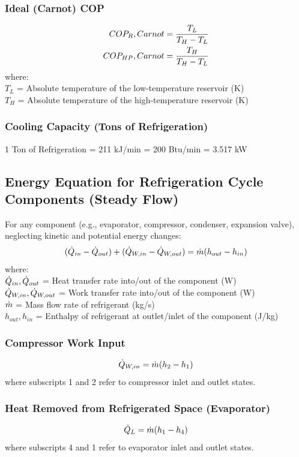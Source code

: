 \subsubsection*{Ideal (Carnot) COP}
\begin{align}
    COP_R,Carnot &= \frac{T_L}{T_H - T_L} \\
    COP_{HP},Carnot &= \frac{T_H}{T_H - T_L}
\end{align}
where: \\
$T_L$ = Absolute temperature of the low-temperature reservoir (K) \\
$T_H$ = Absolute temperature of the high-temperature reservoir (K)

\subsubsection*{Cooling Capacity (Tons of Refrigeration)}
1 Ton of Refrigeration = 211 kJ/min = 200 Btu/min = 3.517 kW

\subsection{Energy Equation for Refrigeration Cycle Components (Steady Flow)}
For any component (e.g., evaporator, compressor, condenser, expansion valve), neglecting kinetic and potential energy changes:
\begin{equation}
    (\dot{Q}_{in} - \dot{Q}_{out}) + (\dot{Q}_{W,in} - \dot{Q}_{W,out}) = \dot{m} (h_{out} - h_{in})
\end{equation}
where: \\
$\dot{Q}_{in}, \dot{Q}_{out}$ = Heat transfer rate into/out of the component (W) \\
$\dot{Q}_{W,in}, \dot{Q}_{W,out}$ = Work transfer rate into/out of the component (W) \\
$\dot{m}$ = Mass flow rate of refrigerant (kg/s) \\
$h_{out}, h_{in}$ = Enthalpy of refrigerant at outlet/inlet of the component (J/kg)

\subsubsection*{Compressor Work Input}
\begin{equation}
    \dot{Q}_{W,in} = \dot{m} (h_2 - h_1)
\end{equation}
where subscripts 1 and 2 refer to compressor inlet and outlet states.

\subsubsection*{Heat Removed from Refrigerated Space (Evaporator)}
\begin{equation}
    \dot{Q}_L = \dot{m} (h_1 - h_4)
\end{equation}
where subscripts 4 and 1 refer to evaporator inlet and outlet states.

